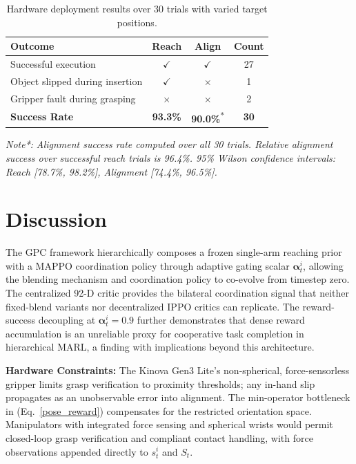 \documentclass[a4paper,fleqn]{cas-dc}
\begin{document}
\begin{table}[t]
\caption{Hardware deployment results over 30 trials with varied target positions.}
\label{hardware_result}
\centering
\footnotesize
\setlength{\tabcolsep}{4pt}
\renewcommand{\arraystretch}{1.2}
\begin{tabular}{l c c c}
\toprule
\textbf{Outcome} & \textbf{Reach} & \textbf{Align} & \textbf{Count} \\
\midrule
Successful execution            & $\checkmark$ & $\checkmark$ & 27 \\
Object slipped during insertion & $\checkmark$ & $\times$     & 1  \\
Gripper fault during grasping   & $\times$     & $\times$     & 2  \\
\midrule
\textbf{Success Rate} & \textbf{93.3\%} & \textbf{90.0\%}\textsuperscript{*} & \textbf{30} \\
\bottomrule
\end{tabular}

\vspace{2pt}
\footnotesize{\textit{Note*:}} \textit{Alignment success rate computed over all 30 trials. Relative alignment success over successful reach trials is 96.4\%. 95\% Wilson confidence intervals: Reach [78.7\%, 98.2\%], Alignment [74.4\%, 96.5\%].}
\end{table}

\section{Discussion}
\label{discussion}
The GPC framework hierarchically composes a frozen single-arm reaching prior with a MAPPO coordination policy through adaptive gating scalar $\mathbf{\alpha}^{i}_{t}$, allowing the blending mechanism and coordination policy to co-evolve from timestep zero. The centralized 92-D critic provides the bilateral coordination signal that neither fixed-blend variants nor decentralized IPPO critics can replicate. The reward-success decoupling at $\mathbf{\alpha}^{i}_{t}=0.9$ further demonstrates that dense reward accumulation is an unreliable proxy for cooperative task completion in hierarchical MARL, a finding with implications beyond this architecture.

\noindent\textbf{Hardware Constraints:} The Kinova Gen3 Lite's non-spherical, force-sensorless gripper limits grasp verification to proximity thresholds; any in-hand slip propagates as an unobservable error into alignment. The min-operator bottleneck in (Eq.~\ref{pose_reward}) compensates for the restricted orientation space. Manipulators with integrated force sensing and spherical wrists would permit closed-loop grasp verification and compliant contact handling, with force observations appended directly to $s^i_{t}$ and $S_t$.
\end{document}
